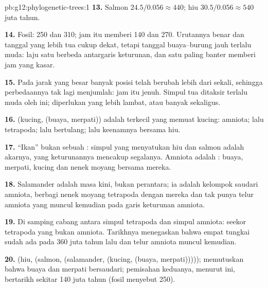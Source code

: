 \begin{solution}{pb:g12:phylogenetic-trees:1}
\textbf{13.} Salmon $24.5/0.056 \approx 440$; hiu $30.5/0.056
\approx 540$ juta tahun.

\textbf{14.} Fosil: 250 dan 310; jam itu memberi 140 dan 270.
Urutannya benar dan tanggal yang lebih tua cukup dekat, tetapi tanggal
buaya--burung jauh terlalu muda: laju satu  berbeda antargaris
keturunan, dan satu  paling banter memberi jam yang kasar.

\textbf{15.} Pada jarak yang besar banyak posisi telah berubah lebih
dari sekali, sehingga perbedaannya tak lagi menjumlah: jam itu jenuh.
Simpul tua ditaksir terlalu muda oleh  ini; diperlukan  yang
lebih lambat, atau banyak  sekaligus.

\textbf{16.} (kucing, (buaya, merpati)) adalah  terkecil yang
memuat kucing: amniota; lalu tetrapoda; lalu  bertulang;
lalu keenamnya bersama hiu.

\textbf{17.} ``Ikan'' bukan sebuah : simpul yang menyatukan hiu
dan salmon adalah akarnya, yang keturunannya mencakup segalanya.
Amniota adalah : buaya, merpati, kucing dan nenek moyang bersama
mereka.

\textbf{18.} Salamander adalah  masa kini, bukan perantara; ia
adalah kelompok saudari amniota, berbagi nenek moyang tetrapoda dengan
mereka dan tak punya telur amniota yang muncul kemudian pada garis
keturunan amniota.

\textbf{19.} Di samping cabang antara simpul tetrapoda dan simpul
amniota: seekor tetrapoda yang bukan amniota. Tarikhnya menegaskan
bahwa empat tungkai sudah ada pada 360 juta tahun lalu dan telur
amniota muncul kemudian.

\textbf{20.} (hiu, (salmon, (salamander, (kucing, (buaya,
merpati)))));  memutuskan bahwa buaya dan merpati bersaudari;
pemisahan keduanya, menurut  ini, bertarikh sekitar 140 juta tahun
(fosil menyebut 250).
\end{solution}
